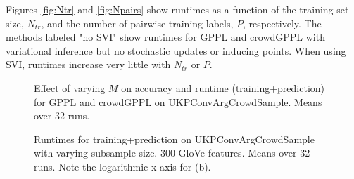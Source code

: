 Figures \ref{fig:Ntr} and \ref{fig:Npairs} show runtimes as a
function of the training set size, $N_{tr}$,
and the number of pairwise training labels, $P$, respectively.
The methods labeled "no SVI" show runtimes
for GPPL and crowdGPPL with variational inference but no stochastic updates 
or inducing points. 
When using SVI, runtimes increase very little 
with $N_{tr}$ or $P$. 
\begin{figure}
\caption{
Effect of varying $M$ on accuracy and runtime (training+prediction) for GPPL and crowdGPPL on UKPConvArgCrowdSample. Means over 32 runs.
}
\label{fig:M}
\end{figure}
\begin{figure}
\caption{
    Runtimes for training+prediction on UKPConvArgCrowdSample with varying subsample size. 300 GloVe features. Means over 32 runs. 
    Note the logarithmic x-axis for (b).
}
\end{figure}

